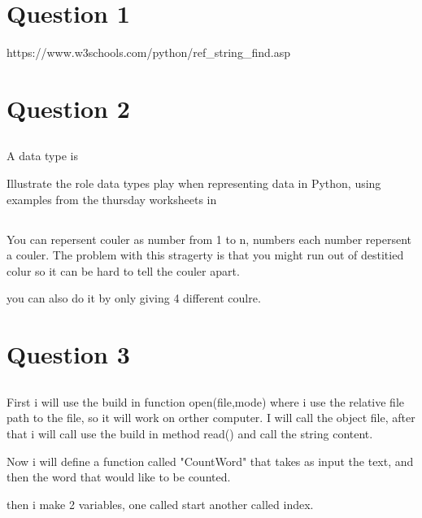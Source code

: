 \documentclass{article}
\begin{document}
\section{Question 1}



https://www.w3schools.com/python/ref_string_find.asp

\section{Question 2}


\subsection{}
A data type is 

Illustrate the role data types play when representing data in Python, using examples from the thursday worksheets in 


\subsection{}

You can repersent couler as number from 1 to n, numbers each number repersent a couler. The problem with this stragerty is that you might run out of destitied colur so it can be hard to tell the couler apart.  


you can also do it by only giving 4 different coulre. 



\newpage

\section{ Question 3}

\subsection{}


First i will use the build in function open(file,mode) where i use the relative file path to the file, so it will work on orther computer. I will call the object file, after that i will call use the build in method read() and call the string content.

Now i will define a function called "CountWord" that takes as input the text, and then the word that would like to be counted.

then i make 2 variables, one called start another called index. 
\end{document}
